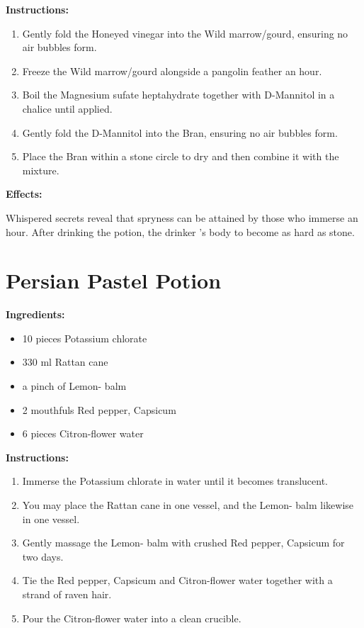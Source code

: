 \documentclass{article}
\begin{document}
\textbf{Instructions:}

\begin{enumerate}
  \item Gently fold the Honeyed vinegar into the Wild marrow/gourd, ensuring no air bubbles form.
  \item Freeze the Wild marrow/gourd alongside a pangolin feather an hour.
  \item Boil the Magnesium sufate heptahydrate together with D-Mannitol in a chalice until applied.
  \item Gently fold the D-Mannitol into the Bran, ensuring no air bubbles form.
  \item Place the Bran within a stone circle to dry and then combine it with the mixture.
\end{enumerate}

\textbf{Effects:}

Whispered secrets reveal that spryness can be attained by those who immerse an hour. After drinking the potion, the drinker 's body to become as hard as stone.

\newpage
\section*{Persian Pastel Potion}

\textbf{Ingredients:}

\begin{itemize}
  \item 10 pieces Potassium chlorate
  \item 330 ml Rattan cane
  \item a pinch of Lemon- balm
  \item 2 mouthfuls Red pepper, Capsicum
  \item 6 pieces Citron-flower water
\end{itemize}

\textbf{Instructions:}

\begin{enumerate}
  \item Immerse the Potassium chlorate in water until it becomes translucent.
  \item You may place the Rattan cane in one vessel, and the Lemon- balm likewise in one vessel.
  \item Gently massage the Lemon- balm with crushed Red pepper, Capsicum for two days.
  \item Tie the Red pepper, Capsicum and Citron-flower water together with a strand of raven hair.
  \item Pour the Citron-flower water into a clean crucible.
\end{enumerate}
\end{document}
